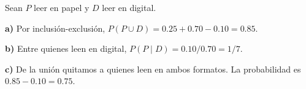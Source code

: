 Sean $P$ leer en papel y $D$ leer en digital.

\textbf{a)} Por inclusión-exclusión,
$P(P\cup D)=0.25+0.70-0.10=\boxed{0.85}$.

\textbf{b)} Entre quienes leen en digital,
$P(P\mid D)=0.10/0.70=\boxed{1/7}$.

\textbf{c)} De la unión quitamos a quienes leen en ambos formatos.
La probabilidad es $0.85-0.10=\boxed{0.75}$.
